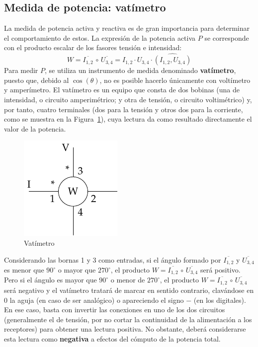 \documentclass[11pt]{book} %
\begin{document}
	\subsection{Medida de potencia: vatímetro}\label{sec.medida_potencia}
	
	La medida de potencia activa y reactiva es de gran importancia para determinar el comportamiento de estos. La expresión de la potencia activa $P$ se corresponde con el producto escalar de los fasores tensión e intensidad:
	\begin{equation*}
	    W=\overline{I_{1,2}}\,\circ\,\overline{U_{3,4}}=I_{1,2}\cdot U_{3,4}\cdot \widehat{(I_{1,2}, U_{3,4})}
	\end{equation*}
	Para medir $P$, se utiliza un instrumento de medida denominado \textbf{vatímetro}, puesto que, debido al $\cos(\theta)$, no es posible hacerlo únicamente con voltímetro y amperímetro. El vatímetro es un equipo que consta de dos bobinas (una de intensidad, o circuito amperimétrico; y otra de tensión, o circuito voltimétrico) y, por tanto, cuatro terminales (dos para la tensión y otros dos para la corriente, como se muestra en la Figura~\ref{fig.vatimetro_2}), cuya lectura da como resultado directamente el valor de la potencia. %
	
	\begin{figure}[htbp]
	    \centering
	    \includegraphics{../figs/vatimetro_2.pdf}
	    \caption{Vatímetro}
	    \label{fig.vatimetro_2}
	\end{figure}
	Considerando las bornas 1 y 3 como entradas, si el ángulo formado por $\overline{I_{1,2}}$ y $\overline{U_{3,4}}$ es menor que $90^\circ$ o mayor que $270^\circ$, el producto $W=\overline{I_{1,2}}\,\circ\,\overline{U_{3,4}}$ será positivo. Pero si el ángulo es mayor que $90^\circ$ o menor de $270^\circ$, el producto $W=\overline{I_{1,2}}\,\circ\,\overline{U_{3,4}}$ será negativo y el vatímetro tratará de marcar en sentido contrario, clavándose en $0$ la aguja (en caso de ser analógico) o apareciendo el signo $-$ (en los digitales). En ese caso, basta con invertir las conexiones en uno de los dos circuitos (generalmente el de tensión, por no cortar la continuidad de la alimentación a los receptores) para obtener una lectura positiva. No obstante, deberá considerarse esta lectura como \textbf{negativa} a efectos del cómputo de la potencia total. 
	
\end{document}
